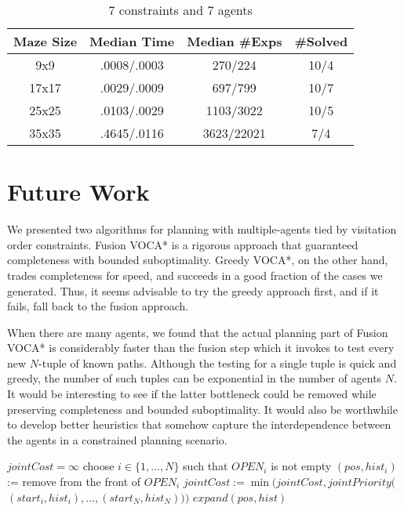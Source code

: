 \documentclass[letterpaper]{article}
\begin{document}
\begin{table}
\centering
\begin{tabular} {|c|c|c|c|} \hline
Maze Size & Median Time & Median \#Exps & \#Solved \\ \hline
9x9 & .0008/.0003 & 270/224 & 10/4 \\ \hline
17x17 & .0029/.0009 & 697/799 & 10/7 \\ \hline
25x25 & .0103/.0029 & 1103/3022 & 10/5 \\ \hline
35x35 & .4645/.0116 & 3623/22021 & 7/4 \\ \hline
\end{tabular}
\caption{7 constraints and 7 agents}
\label{tab:rows}
\end{table}

\section{Future Work}

We presented two algorithms for planning with multiple-agents tied by visitation order constraints. Fusion VOCA* is a rigorous approach that guaranteed completeness with bounded suboptimality. Greedy VOCA*, on the other hand, trades completeness for speed, and succeeds in a good fraction of the cases we generated. Thus, it seems advisable to try the greedy approach first, and if it fails, fall back to the fusion approach.

When there are many agents, we found that the actual planning part of Fusion VOCA* is considerably faster than the fusion step which it invokes to test every new $N$-tuple of known paths. Although the testing for a single tuple is quick and greedy, the number of such tuples can be exponential in the number of agents $N$. It would be interesting to see if the latter bottleneck could be removed while preserving completeness and bounded suboptimality.  It would also be worthwhile to develop better heuristics that somehow capture the interdependence between the agents in a constrained planning scenario.

\begin{algorithm}
\caption{$search()$}
\label{alg:update}
\begin{algorithmic}
\STATE $jointCost = \infty$
\STATE choose $i\in\{1,\ldots,N\}$ such that $OPEN_{i}$ is not empty
\STATE $(pos, hist_i)$ := remove from the front of $OPEN_{i}$
\STATE $jointCost := \min(jointCost,jointPriority($\\\qquad$(start_i,hist_i),\ldots,(start_N,hist_N)))$
\ENDFOR
\ENDIF
\STATE $expand(pos, hist)$
\ENDWHILE
\end{algorithmic}
\end{algorithm}
\end{document}
